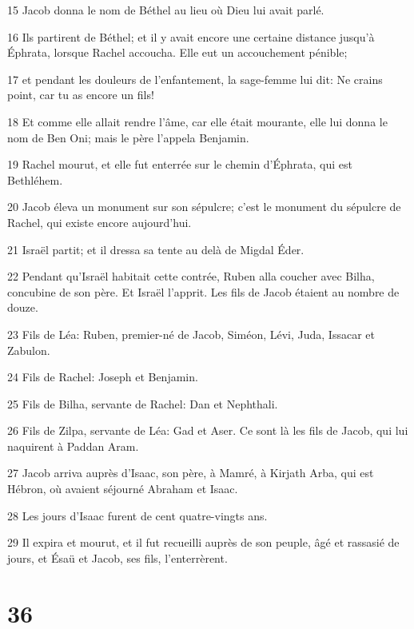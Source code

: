 \par 15 Jacob donna le nom de Béthel au lieu où Dieu lui avait parlé.
\par 16 Ils partirent de Béthel; et il y avait encore une certaine distance jusqu'à Éphrata, lorsque Rachel accoucha. Elle eut un accouchement pénible;
\par 17 et pendant les douleurs de l'enfantement, la sage-femme lui dit: Ne crains point, car tu as encore un fils!
\par 18 Et comme elle allait rendre l'âme, car elle était mourante, elle lui donna le nom de Ben Oni; mais le père l'appela Benjamin.
\par 19 Rachel mourut, et elle fut enterrée sur le chemin d'Éphrata, qui est Bethléhem.
\par 20 Jacob éleva un monument sur son sépulcre; c'est le monument du sépulcre de Rachel, qui existe encore aujourd'hui.
\par 21 Israël partit; et il dressa sa tente au delà de Migdal Éder.
\par 22 Pendant qu'Israël habitait cette contrée, Ruben alla coucher avec Bilha, concubine de son père. Et Israël l'apprit. Les fils de Jacob étaient au nombre de douze.
\par 23 Fils de Léa: Ruben, premier-né de Jacob, Siméon, Lévi, Juda, Issacar et Zabulon.
\par 24 Fils de Rachel: Joseph et Benjamin.
\par 25 Fils de Bilha, servante de Rachel: Dan et Nephthali.
\par 26 Fils de Zilpa, servante de Léa: Gad et Aser. Ce sont là les fils de Jacob, qui lui naquirent à Paddan Aram.
\par 27 Jacob arriva auprès d'Isaac, son père, à Mamré, à Kirjath Arba, qui est Hébron, où avaient séjourné Abraham et Isaac.
\par 28 Les jours d'Isaac furent de cent quatre-vingts ans.
\par 29 Il expira et mourut, et il fut recueilli auprès de son peuple, âgé et rassasié de jours, et Ésaü et Jacob, ses fils, l'enterrèrent.

\chapter{36}

